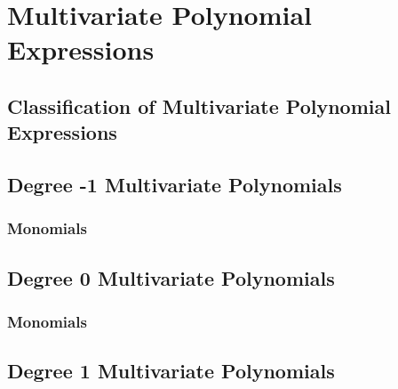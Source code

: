 %
%


\chapter{Multivariate Polynomial Expressions}

\section*{Classification of Multivariate Polynomial Expressions}

\section*{Degree -1 Multivariate Polynomials}

\subsection*{Monomials}

\section*{Degree 0 Multivariate Polynomials}

\subsection*{Monomials}

\section*{Degree 1 Multivariate Polynomials}

